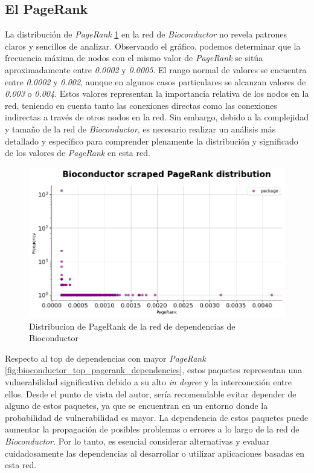 \subsection{El PageRank}

La distribución de \textit{PageRank} \ref{fig:bioconductor_pagerank_dist} en la red de \textit{Bioconductor} no revela patrones claros 
y sencillos de analizar. Observando el gráfico, podemos determinar que la frecuencia máxima de nodos 
con el mismo valor de \textit{PageRank} se sitúa aproximadamente entre \textit{0.0002} y \textit{0.0005}. 
El rango normal de valores se encuentra entre \textit{0.0002} y \textit{0.002}, aunque en algunos casos 
particulares se alcanzan valores de \textit{0.003} o \textit{0.004}. Estos valores representan la importancia 
relativa de los nodos en la red, teniendo en cuenta tanto las conexiones directas como las conexiones 
indirectas a través de otros nodos en la red. Sin embargo, debido a la complejidad y tamaño de la red 
de \textit{Bioconductor}, es necesario realizar un análisis más detallado y específico para comprender 
plenamente la distribución y significado de los valores de \textit{PageRank} en esta red.

\begin{figure}[h!]
    \begin{center}
        \includegraphics[width=1\textwidth]{img/bioconductor/pagerank_dist.png}
        \caption{Distribucion de PageRank de la red de dependencias de Bioconductor}
        \label{fig:bioconductor_pagerank_dist}
    \end{center}
\end{figure}


Respecto al top de dependencias con mayor \textit{PageRank} \ref{fig:bioconductor_top_pagerank_dependencies}, 
estos paquetes representan una vulnerabilidad significativa debido a su alto \textit{in degree} y la interconexión entre ellos. Desde el punto de vista 
del autor, sería recomendable evitar depender de alguno de estos paquetes, ya que se encuentran en un entorno 
donde la probabilidad de vulnerabilidad es mayor. La dependencia de estos paquetes puede aumentar la propagación 
de posibles problemas o errores a lo largo de la red de \textit{Bioconductor}. Por lo tanto, es esencial 
considerar alternativas y evaluar cuidadosamente las dependencias al desarrollar o utilizar aplicaciones 
basadas en esta red.

